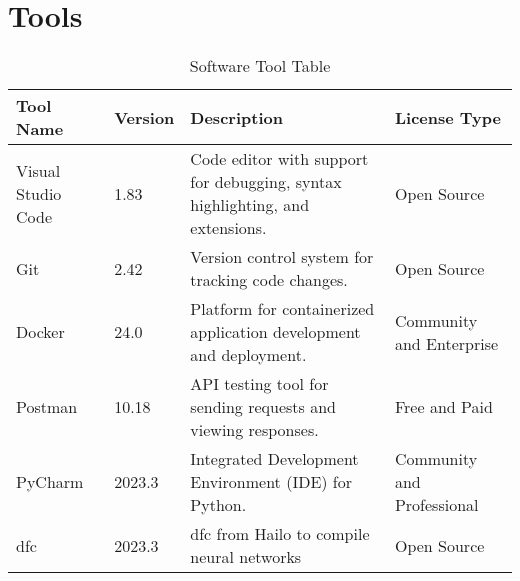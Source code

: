 \chapter{Tools}

\begin{table}[h!]
    \centering
    
    \begin{tabularx}{\textwidth}{|l|l|X|l|}
        \hline
        \textbf{Tool Name} & \textbf{Version} & \textbf{Description} & \textbf{License Type} \\ \hline
        Visual Studio Code & 1.83 & Code editor with support for debugging, syntax highlighting, and extensions. & Open Source \\ \hline
        Git               & 2.42 & Version control system for tracking code changes. & Open Source \\ \hline
        Docker            & 24.0 & Platform for containerized application development and deployment. & Community and Enterprise \\ \hline
        Postman           & 10.18 & API testing tool for sending requests and viewing responses. & Free and Paid \\ \hline
        PyCharm           & 2023.3 & Integrated Development Environment (IDE) for Python. & Community and Professional \\ \hline
        \acrlong{dfc}     & 2023.3 & \acrlong{dfc} from Hailo to compile neural networks & Open Source \\ \hline
    \end{tabularx}
    \caption{Software Tool Table}
    \label{tab:software-tools}
\end{table}